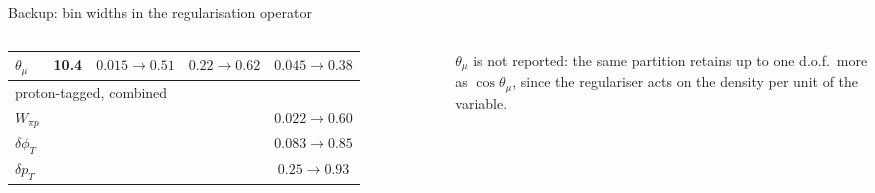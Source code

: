 \documentclass[aspectratio=169,10pt]{beamer}
\begin{document}
\begin{frame}{Backup: bin widths in the regularisation operator}
\begin{columns}[T]
\begin{tabular}{lcccc}
    $\theta_\mu$ & 10.4 & $\mathbf{0.015\to0.51}$ & $0.22\to0.62$ & $0.045\to0.38$ \\\midrule
    \multicolumn{5}{l}{proton-tagged, combined} \\
    $W_{\pi p}$ & & & & $\mathbf{0.022\to0.60}$ \\
    $\delta\phi_T$ & & & & $\mathbf{0.083\to0.85}$ \\
    $\delta p_T$ & & & & $0.25\to0.93$ \\
    \bottomrule
  \end{tabular}\\[2mm]
  \raggedright $\theta_\mu$ is not reported: the same partition retains up to one d.o.f.\ more as $\cos\theta_\mu$,
  since the regulariser acts on the density per unit of the variable.
  \end{columns}
\end{frame}
\end{document}
